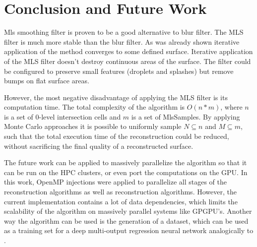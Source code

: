         


\section{Conclusion and Future Work}
Mls smoothing filter is proven to be a good alternative to blur filter. The MLS filter is much more stable than the blur filter. As was already shown iterative application of the method converges to some defined surface. Iterative application of the MLS filter doesn't destroy continuous areas of the surface. The filter could be configured to preserve small features (droplets and splashes) but remove bumps on flat surface areas.

However, the most negative disadvantage of applying the MLS filter is its computation time. The total complexity of the algorithm is $O(n*m)$, where $n$ is a set of 0-level intersection cells and $m$ is a set of MlsSamples. By applying Monte Carlo approaches it is possible to uniformly sample $N \subseteq n$ and $M \subseteq m$, such that the total execution time of the reconstruction could be reduced, without sacrificing the final quality of a reconstructed surface.

The future work can be applied to massively parallelize the algorithm so that it can be run on the HPC clusters, or even port the computations on the GPU. In this work, OpenMP injections were applied to parallelize all stages of the reconstruction algorithms as well as reconstruction algorithms. However, the current implementation contains a lot of data dependencies, which limits the scalability of the algorithm on massively parallel systems like GPGPU's.
 Another way the algorithm can be used is the generation of a dataset, which can be used as a training set for a deep multi-output regression neural network analogically to \cite{DNNNoiseFilter}.